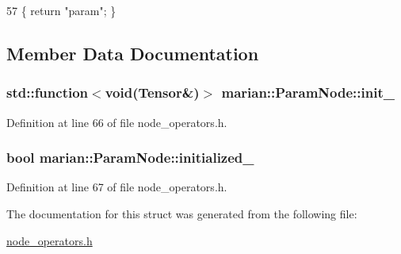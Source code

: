 \begin{DoxyCode}
57 \{ \textcolor{keywordflow}{return} \textcolor{stringliteral}{"param"}; \}
\end{DoxyCode}


\subsection{Member Data Documentation}
\subsubsection[{\texorpdfstring{init\+\_\+}{init_}}]{\setlength{\rightskip}{0pt plus 5cm}std\+::function$<$void({\bf Tensor}\&)$>$ marian\+::\+Param\+Node\+::init\+\_\+\hspace{0.3cm}{\ttfamily [private]}}\hypertarget{structmarian_1_1ParamNode_a1cc49dadd3e5d7490bb094a5f675d01b}{}\label{structmarian_1_1ParamNode_a1cc49dadd3e5d7490bb094a5f675d01b}


Definition at line 66 of file node\+\_\+operators.\+h.

\subsubsection[{\texorpdfstring{initialized\+\_\+}{initialized_}}]{\setlength{\rightskip}{0pt plus 5cm}bool marian\+::\+Param\+Node\+::initialized\+\_\+\hspace{0.3cm}{\ttfamily [private]}}\hypertarget{structmarian_1_1ParamNode_a4c0eec72e118e3b2cfc1541d5224b6c8}{}\label{structmarian_1_1ParamNode_a4c0eec72e118e3b2cfc1541d5224b6c8}


Definition at line 67 of file node\+\_\+operators.\+h.



The documentation for this struct was generated from the following file\+:\begin{DoxyCompactItemize}
\item 
\hyperlink{node__operators_8h}{node\+\_\+operators.\+h}\end{DoxyCompactItemize}
